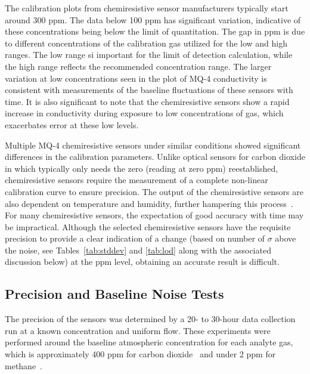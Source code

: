 \documentclass[times]{joehreview}
\begin{document}
	The calibration plots from chemiresistive sensor manufacturers typically start around 300 ppm.  The data below 100 ppm has significant variation, indicative of these concentrations being below the limit of quantitation.  The gap in ppm is due to different concentrations of the calibration gas utilized for the low and high ranges.  The low range si important for the limit of detection calculation, while the high range reflects the recommended concentration range. The larger variation at low concentrations seen in the plot of MQ-4 conductivity is consistent with measurements of the baseline fluctuations of these sensors with time.  It is also significant to note that the chemiresistive sensors show a rapid increase in conductivity during exposure to low concentrations of gas, which exacerbates error at these low levels.
	
	Multiple MQ-4 chemiresistive sensors under similar conditions showed significant differences in the calibration parameters.  Unlike optical sensors for carbon dioxide in which typically only needs the zero (reading at zero ppm) reestablished, chemiresistive sensors require the measurement of a complete non-linear calibration curve to ensure precision.  The output of the chemiresistive sensors are also dependent on temperature and humidity, further hampering this process~\cite{benkstein_analytical_2014}.  For many chemiresistive sensors, the expectation of good accuracy with time may be impractical.  Although the selected chemiresistive sensors have the requisite precision to provide a clear indication of a change (based on number of $\sigma$ above the noise, see Tables~\ref{tab:stddev} and \ref{tab:lod} along with the associated discussion below) at the ppm level, obtaining an accurate result is difficult.
	
	\subsection{Precision and Baseline Noise Tests}
	\label{sec:method_baseline}
	The precision of the sensors was determined by a 20- to 30-hour data collection run at a known concentration and uniform flow.  These experiments were performed around the baseline atmospheric concentration for each analyte gas, which is approximately 400 ppm for carbon dioxide~\cite{blasing_recent_2016,dlugokencky_trends_2016} and under 2 ppm for methane~\cite{turner_large_2016,bamberger_spatial_2014,dlugokencky_trends_2016-1}. 
	
\end{document}
